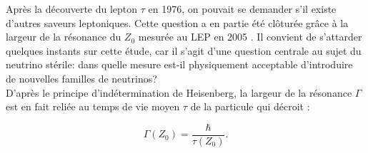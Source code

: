 
Après la découverte du lepton $\tau$ en 1976, on pouvait se demander s'il existe d'autres saveurs leptoniques. Cette question a en partie été clôturée grâce à la largeur de la résonance du $Z_0$ mesurée au LEP en 2005 \cite{ALEPH:2005ab}. Il convient de s'attarder quelques instants sur cette étude, car il s'agit d'une question centrale au sujet du neutrino stérile: dans quelle mesure est-il physiquement acceptable d'introduire de nouvelles familles de neutrinos? \\

D'après le principe d'indétermination de Heisenberg, la largeur de la résonance $\Gamma$ est en fait reliée au temps de vie moyen $\tau$ de la particule qui décroit :

\begin{equation}
    \Gamma(Z_0) = \frac{\hbar}{\tau(Z_0)}.
\end{equation}

